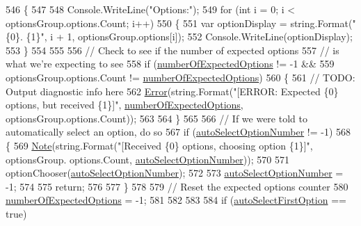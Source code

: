 \begin{DoxyCode}
546             \{
547 
548                 Console.WriteLine(\textcolor{stringliteral}{"Options:"});
549                 \textcolor{keywordflow}{for} (\textcolor{keywordtype}{int} i = 0; i < optionsGroup.options.Count; i++)
550                 \{
551                     var optionDisplay = string.Format(\textcolor{stringliteral}{"\{0\}. \{1\}"}, i + 1, optionsGroup.options[i]);
552                     Console.WriteLine(optionDisplay);
553                 \}
554 
555 
556                 \textcolor{comment}{// Check to see if the number of expected options}
557                 \textcolor{comment}{// is what we're expecting to see}
558                 \textcolor{keywordflow}{if} (\hyperlink{a00034_a2e17937195ecd64d5d867d958c45d2c3}{numberOfExpectedOptions} != -1 &&
559                     optionsGroup.options.Count != \hyperlink{a00034_a2e17937195ecd64d5d867d958c45d2c3}{numberOfExpectedOptions})
560                 \{
561                     \textcolor{comment}{// TODO: Output diagnostic info here}
562                     \hyperlink{a00169_a2f63f9f5b7634cb50ee75ff2eb18b137}{Error}(\textcolor{keywordtype}{string}.Format(\textcolor{stringliteral}{"[ERROR: Expected \{0\} options, but received \{1\}]"}, 
      \hyperlink{a00034_a2e17937195ecd64d5d867d958c45d2c3}{numberOfExpectedOptions}, optionsGroup.options.Count));
563 
564                 \}
565 
566                 \textcolor{comment}{// If we were told to automatically select an option, do so}
567                 \textcolor{keywordflow}{if} (\hyperlink{a00034_a34886671e91a1bf3fc225eeb67baced1}{autoSelectOptionNumber} != -1)
568                 \{
569                     \hyperlink{a00169_a939cc9e943c574b36c6af93e9c772702}{Note}(\textcolor{keywordtype}{string}.Format(\textcolor{stringliteral}{"[Received \{0\} options, choosing option \{1\}]"}, optionsGroup.
      options.Count, \hyperlink{a00034_a34886671e91a1bf3fc225eeb67baced1}{autoSelectOptionNumber}));
570 
571                     optionChooser(\hyperlink{a00034_a34886671e91a1bf3fc225eeb67baced1}{autoSelectOptionNumber});
572 
573                     \hyperlink{a00034_a34886671e91a1bf3fc225eeb67baced1}{autoSelectOptionNumber} = -1;
574 
575                     \textcolor{keywordflow}{return};
576 
577                 \}
578 
579                 \textcolor{comment}{// Reset the expected options counter}
580                 \hyperlink{a00034_a2e17937195ecd64d5d867d958c45d2c3}{numberOfExpectedOptions} = -1;
581 
582 
583 
584                 \textcolor{keywordflow}{if} (\hyperlink{a00034_a09a552ee9ff58cb3c995f8ecba1592b6}{autoSelectFirstOption} == \textcolor{keyword}{true})

\end{DoxyCode}
